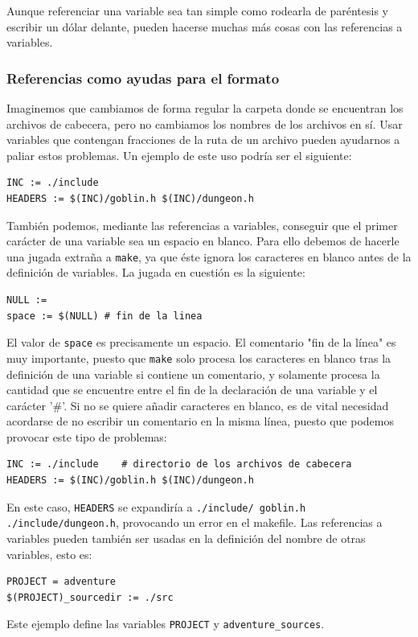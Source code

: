 \documentclass[11pt,twoside,titlepage,a4paper]{article}
\theoremstyle{definition}
\theoremstyle{plain_rojo}
\theoremstyle{remark}
\begin{document}
Aunque referenciar una variable sea tan simple como rodearla de paréntesis y 
escribir un dólar delante, pueden hacerse muchas más cosas con las 
referencias a variables.

\subsubsection{Referencias como ayudas para el formato}

Imaginemos que cambiamos de forma regular la carpeta donde se encuentran los 
archivos de cabecera, pero no cambiamos los nombres de los archivos en sí. 
Usar variables que contengan fracciones de la ruta de un archivo pueden 
ayudarnos a paliar estos problemas. Un ejemplo de este uso podría ser el 
siguiente:
\bigskip
\begin{lstlisting}
INC := ./include
HEADERS := $(INC)/goblin.h $(INC)/dungeon.h
\end{lstlisting}
\bigskip
También podemos, mediante las referencias a variables, conseguir que el 
primer carácter de una variable sea un espacio en blanco. Para ello debemos 
de hacerle una jugada extraña a \texttt{make}, ya que éste ignora los 
caracteres en blanco antes de la definición de variables. La jugada en 
cuestión es la siguiente:
\bigskip
\begin{lstlisting}
NULL :=
space := $(NULL) # fin de la linea
\end{lstlisting}
\bigskip
El valor de \texttt{space} es precisamente un espacio. El comentario "fin de la línea" es muy importante, puesto que \texttt{make} solo procesa los caracteres en blanco tras la definición de una variable si contiene un comentario, y solamente procesa la cantidad que se encuentre entre el fin de la declaración de una variable y el carácter '\#'. Si no se quiere añadir caracteres en blanco, es de vital necesidad acordarse de no escribir un comentario en la misma línea, puesto que podemos provocar este tipo de problemas:
\bigskip
\begin{lstlisting}
INC := ./include    # directorio de los archivos de cabecera
HEADERS := $(INC)/goblin.h $(INC)/dungeon.h
\end{lstlisting}
\bigskip
En este caso, \texttt{HEADERS} se expandiría a \texttt{./include\quad/
goblin.h ./include\quad/dungeon.h}, provocando un error en el makefile.
Las referencias a variables pueden también ser usadas en la definición del nombre de otras variables, esto es:
\bigskip
\begin{lstlisting}
PROJECT = adventure
$(PROJECT)_sourcedir := ./src
\end{lstlisting}
\bigskip
Este ejemplo define las variables \texttt{PROJECT} y
\texttt{adventure\_sources}.
\end{document}
